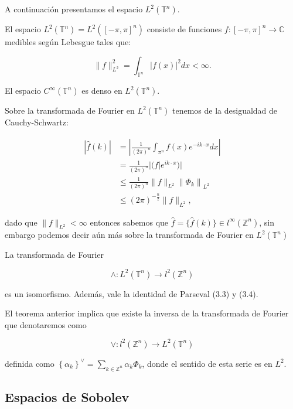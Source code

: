 \documentclass[12pt]{article}
\newcommand\Z{\ensuremath{\mathbb{Z}}}
\newcommand\T{\mathbb{T}}
\begin{document}
A continuación presentamos el espacio $L^2(\T^n)$.

\begin{definition}
El espacio $L^2\left(\mathbb{T}^n\right)=L^2\left([-\pi, \pi]^n\right)$ consiste de funciones $f:[-\pi, \pi]^n \rightarrow \mathbb{C}$ medibles según Lebesgue tales que:

$$\|f\|_{L^2}^2=\int_{\T^n}|f(x)|^2 d x<\infty.$$
\end{definition}

\begin{theorem}
El espacio $C^{\infty}\left(\mathbb{T}^n\right)$ es denso en $L^2\left(\mathbb{T}^n\right)$.    
\end{theorem}

Sobre la transformada de Fourier en $L^2(\T^n)$ tenemos de la desigualdad de Cauchy-Schwartz:

$$
\begin{aligned}
|\hat{f}(k)| & =\left|\frac{1}{(2 \pi)^n} \int_{\pi^n} f(x) e^{-i k \cdot x} d x\right| \\
& =\frac{1}{(2 \pi)^n} |(f|e^{i k \cdot x}) | \\
& \leq \frac{1}{(2 \pi)^n}\|f\|_{L^2}\left\|\Phi_k \right\|_{L^2} \\
& \leq(2 \pi)^{-\frac{n}{2}}\|f\|_{L^2},
\end{aligned}
$$

dado que $\|f\|_{L^2}<\infty$ entonces sabemos que $\widehat{f}=\{\widehat{f}(k)\}\in l^{\infty}(\Z^n)$, sin embargo podemos decir aún más sobre la transformada de Fourier en $L^2(\T^n)$

\begin{theorem}

La transformada de Fourier

$$
\wedge: L^2\left(\mathbb{T}^n\right) \rightarrow l^2\left(\mathbb{Z}^n\right)
$$

es un isomorfismo. Además, vale la identidad de Parseval (3.3) y (3.4).
\end{theorem}

El teorema anterior implica que existe la inversa de la transformada de Fourier que denotaremos como

$$
\vee: l^2\left(\mathbb{Z}^n\right) \rightarrow L^2\left(\mathbb{T}^n\right)
$$

definida como $\left\{\alpha_k\right\}^{\vee}=\displaystyle\sum_{k \in \mathbb{Z}^n} \alpha_k \Phi_k$, donde el sentido de esta serie es en $L^2$.


\subsection{Espacios de Sobolev}
\end{document}
